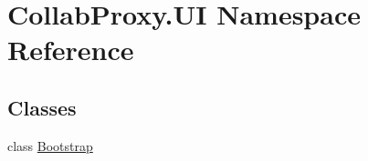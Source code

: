 \hypertarget{namespace_collab_proxy_1_1_u_i}{}\section{Collab\+Proxy.\+UI Namespace Reference}
\label{namespace_collab_proxy_1_1_u_i}
\subsection*{Classes}
\begin{DoxyCompactItemize}
\item 
class \mbox{\hyperlink{class_collab_proxy_1_1_u_i_1_1_bootstrap}{Bootstrap}}
\end{DoxyCompactItemize}
